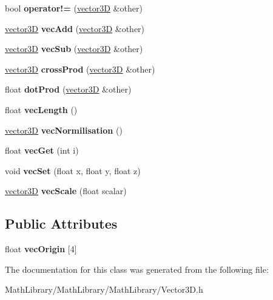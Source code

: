 \begin{DoxyCompactItemize}
\item 
\mbox{\label{classvector3_d_a0636631661d36d2bed14360d205507ff}} 
bool {\bfseries operator!=} (\hyperlink{classvector3_d}{vector3D} \&other)
\item 
\mbox{\label{classvector3_d_a420043a827564a415bd3f90dfd20ee8a}} 
\hyperlink{classvector3_d}{vector3D} {\bfseries vec\+Add} (\hyperlink{classvector3_d}{vector3D} \&other)
\item 
\mbox{\label{classvector3_d_a7944ecb24e5ae4a86776719de36c1f00}} 
\hyperlink{classvector3_d}{vector3D} {\bfseries vec\+Sub} (\hyperlink{classvector3_d}{vector3D} \&other)
\item 
\mbox{\label{classvector3_d_a00b23ade722f5f902fc12ac04cf1f8aa}} 
\hyperlink{classvector3_d}{vector3D} {\bfseries cross\+Prod} (\hyperlink{classvector3_d}{vector3D} \&other)
\item 
\mbox{\label{classvector3_d_a142bed5b63a11ad04ff698f510133757}} 
float {\bfseries dot\+Prod} (\hyperlink{classvector3_d}{vector3D} \&other)
\item 
\mbox{\label{classvector3_d_a676f32f80fe84cf2723a45aea07669b0}} 
float {\bfseries vec\+Length} ()
\item 
\mbox{\label{classvector3_d_ab9003c1013ca77a415adc00b4ccd2918}} 
\hyperlink{classvector3_d}{vector3D} {\bfseries vec\+Normilisation} ()
\item 
\mbox{\label{classvector3_d_aa7064829e337a1ee2e0b54df879d1023}} 
float {\bfseries vec\+Get} (int i)
\item 
\mbox{\label{classvector3_d_abf5b363ee81661dc44ae6e76c2d00c02}} 
void {\bfseries vec\+Set} (float x, float y, float z)
\item 
\mbox{\label{classvector3_d_a59aed6b24b2a1415135e67248266a82e}} 
\hyperlink{classvector3_d}{vector3D} {\bfseries vec\+Scale} (float scalar)
\end{DoxyCompactItemize}
\subsection*{Public Attributes}
\begin{DoxyCompactItemize}
\item 
\mbox{\label{classvector3_d_a7d48999a74cdff49720356ba86f7038f}} 
float {\bfseries vec\+Origin} \mbox{[}4\mbox{]}
\end{DoxyCompactItemize}


The documentation for this class was generated from the following file\+:\begin{DoxyCompactItemize}
\item 
Math\+Library/\+Math\+Library/\+Math\+Library/Vector3\+D.\+h\end{DoxyCompactItemize}
